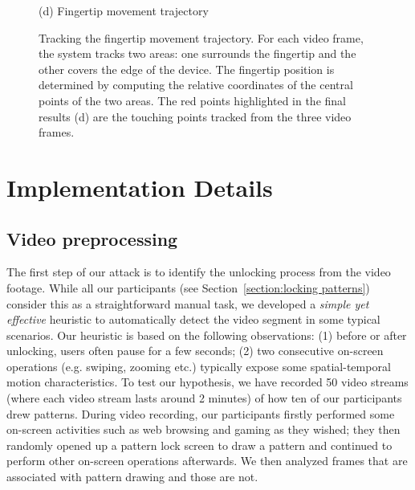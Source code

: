 \begin{figure}[!t]
{\begin{minipage}[t]{4.2cm}
                \centering \footnotesize (d) Fingertip movement trajectory
                \end{minipage}
            }
            \caption{Tracking the fingertip movement trajectory. For each video frame, the system tracks two areas: one surrounds the fingertip and the other covers the edge of the device.
            The fingertip position is determined by computing the relative coordinates of the central points of the two areas.
            The red points highlighted in the final results (d) are the touching points tracked from the three video frames.}
            \label{fig:fig5}
        \end{figure}

\section{Implementation Details}

\subsection{Video preprocessing \label{sec:identify}}
\label{section:recognition}
The first step of our attack is to identify the unlocking process from the
video footage. While all our
participants (see Section~\ref{section:locking patterns}) consider this as a straightforward manual task, we developed a \emph{simple yet effective} heuristic to automatically detect the video segment in some typical scenarios. Our heuristic is based on the following observations: (1) before or after
unlocking, users often pause for a few seconds; (2) two consecutive on-screen operations (e.g. swiping, zooming etc.) typically expose some spatial-temporal motion characteristics.
To test our hypothesis, we have recorded 50 video streams (where each
video stream lasts around 2 minutes) of how ten of our participants drew
patterns. During video recording, our participants firstly performed
some on-screen activities such as web browsing and gaming as they wished;
they then randomly opened up a pattern lock screen to draw a pattern and
continued to perform other on-screen operations afterwards.
We then analyzed frames that are associated with pattern drawing and those are not.


